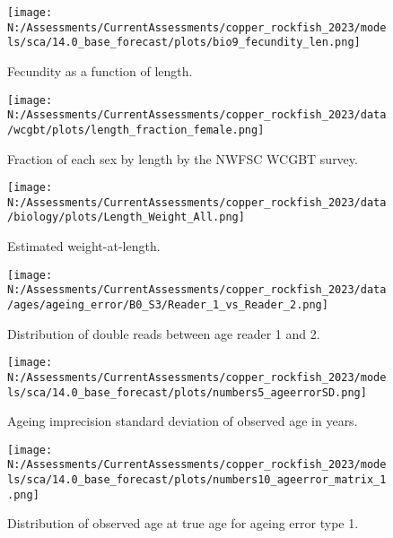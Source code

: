 \documentclass[11pt,
  english,
  letterpaper,
]{article}
\begin{document}
\pagebreak

\begin{figure}
\centering
\texttt{[image: N:/Assessments/CurrentAssessments/copper\_rockfish\_2023/models/sca/14.0\_base\_forecast/plots/bio9\_fecundity\_len.png]}
\caption{Fecundity as a function of length.\label{fig:fecundity}}
\end{figure}

\pagebreak

\begin{figure}
\centering
\texttt{[image: N:/Assessments/CurrentAssessments/copper\_rockfish\_2023/data/wcgbt/plots/length\_fraction\_female.png]}
\caption{Fraction of each sex by length by the NWFSC WCGBT survey.\label{fig:frac-sex-len}}
\end{figure}

\pagebreak

\begin{figure}
\centering
\texttt{[image: N:/Assessments/CurrentAssessments/copper\_rockfish\_2023/data/biology/plots/Length\_Weight\_All.png]}
\caption{Estimated weight-at-length.\label{fig:weight-length}}
\end{figure}

\pagebreak

\begin{figure}
\centering
\texttt{[image: N:/Assessments/CurrentAssessments/copper\_rockfish\_2023/data/ages/ageing\_error/B0\_S3/Reader\_1\_vs\_Reader\_2.png]}
\caption{Distribution of double reads between age reader 1 and 2.\label{fig:age-error-dist}}
\end{figure}

\pagebreak

\begin{figure}
\centering
\texttt{[image: N:/Assessments/CurrentAssessments/copper\_rockfish\_2023/models/sca/14.0\_base\_forecast/plots/numbers5\_ageerrorSD.png]}
\caption{Ageing imprecision standard deviation of observed age in years.\label{fig:age-error}}
\end{figure}

\pagebreak

\begin{figure}
\centering
\texttt{[image: N:/Assessments/CurrentAssessments/copper\_rockfish\_2023/models/sca/14.0\_base\_forecast/plots/numbers10\_ageerror\_matrix\_1.png]}
\caption{Distribution of observed age at true age for ageing error type 1.\label{fig:age-error-matrix}}
\end{figure}
\end{document}
